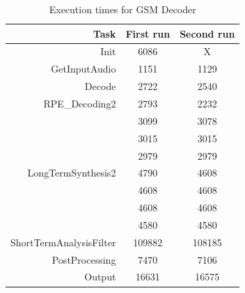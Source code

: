 \documentclass[a4paper, 12pt]{article}
\begin{document}
\begin{table}[h]
  \centering
  \begin{tabular}{r c c}
    \hline
    Task & First run & Second run \\
    \hline
    Init & 6086 & X \\
    GetInputAudio &1151 & 1129\\
    Decode & 2722& 2540\\
    RPE\_Decoding2 &2793&2232\\
                   &3099&3078\\
                   &3015&3015\\
                   &2979&2979\\
    LongTermSynthesis2 &4790&4608\\
                       &4608&4608\\
                       &4608&4608\\
                       &4580&4580\\
    ShortTermAnalysisFilter & 109882 & 108185\\
    PostProcessing & 7470& 7106\\
    Output & 16631& 16575\\
  \end{tabular}
  \caption{Execution times for GSM Decoder}
  \label{fig:decode}
\end{table}
\end{document}
